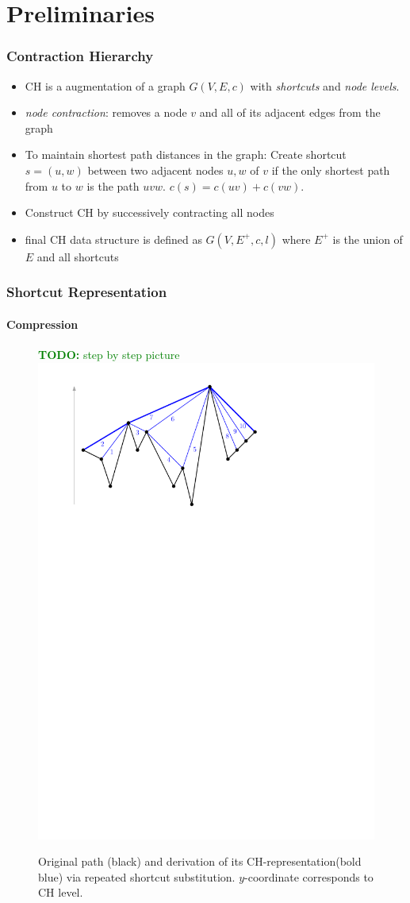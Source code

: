 \documentclass{beamer}
\newcommand{\TODO}[1]{\noindent\textcolor{green}{\textbf{TODO:} #1}}
\newcommand{\chrep}{CH-representation\xspace}
\begin{document}
\section{Preliminaries}
\begin{frame}
	\frametitle{Contraction Hierarchy}
	\begin{itemize}
		\item<1-> CH is a augmentation of a graph $G(V,E,c)$ with \emph{shortcuts} and \emph{node levels}.
		\item<2-> \emph{node contraction}: removes a node $v$ and all of its adjacent edges from the graph
		\item<3-> To maintain shortest path distances in the graph: Create shortcut $s = (u, w)$ between two adjacent nodes $u,w$ of $v$ if the only shortest path from $u$ to $w$ is the path $uvw$. $c(s) = c(uv) + c(vw)$.
		\item<4-> Construct CH by successively contracting all nodes
		\item<5-> final CH data structure is defined as $G(V, E^+, c, l)$ where $E^+$ is the union of $E$ and all shortcuts
	\end{itemize}
\end{frame}

\begin{frame}
	\frametitle{Shortcut Representation}
	\framesubtitle{Compression}
	\begin{figure}
		\TODO{step by step picture}
		\includegraphics[width=.76\columnwidth]{images/toch}
		\caption{Original path (black) and derivation of its \chrep (bold blue) via repeated shortcut substitution. $y$-coordinate corresponds to CH level.}
	\end{figure}
\end{frame}
\end{document}
